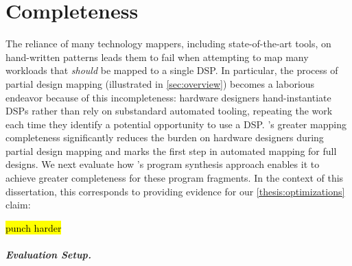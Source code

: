 \section{\lr Completeness}
\label{sec:completeness}
% 
% 
The reliance of many technology mappers,
  including state-of-the-art tools,
  on hand-written patterns
  leads them to fail when attempting to map many workloads
  that \textit{should} be mapped to a single DSP.
In particular, 
  the process of partial
  design mapping 
  (illustrated in \cref{sec:overview}) 
  becomes
  a laborious endeavor because
  of this incompleteness:
  hardware designers
  hand-instantiate DSPs rather
  than rely on substandard
  automated tooling, repeating
  the work each time they identify a potential
  opportunity to use a DSP.
\lr's greater mapping completeness 
  significantly
  reduces the burden on hardware
  designers during partial
  design mapping and marks 
  the first step in automated
  mapping for full designs.
  We next evaluate how \lr's program synthesis approach
  enables it to achieve greater completeness
  for these program fragments.
In the context of this dissertation,
  this corresponds to providing evidence
  for our \cref{thesis:optimizations} claim:
\begin{quote}
  \thesisclaimoptimizations
\end{quote}
\hl{punch harder}
  
\paragraph{\textnormal{\textit{\textbf{Evaluation Setup.}}}}

